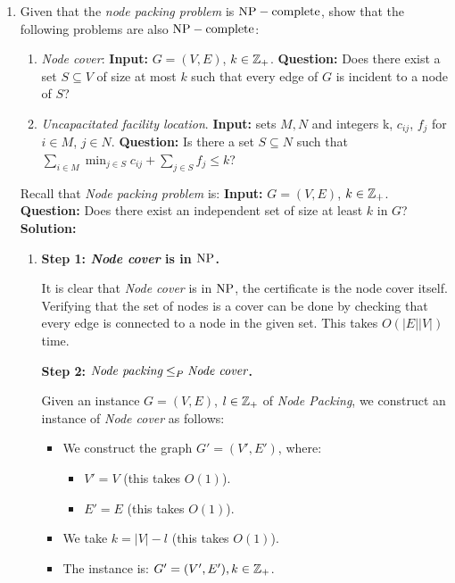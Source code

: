 \begin{enumerate}
\begin{enumerate}
{\bf Conclusion:}	the optimization version of the TSP problem is $\NP$-hard.
	
\end{enumerate}


\item Given that the {\em node packing problem} is $\NP-\text{complete}$, show that the following problems are also $\NP-\text{complete}$:
\begin{enumerate}
	\item {\em Node cover}: {\bf Input:} $G=(V,E)$, $k\in \Z_+$. {\bf Question:}  Does there exist a set $S\subseteq V$ of size at most $k$ such that every edge of $G$ is incident to a node of $S$?
	\item {\em Uncapacitated facility location}. {\bf Input:} sets $M,N$ and integers k, $c_{ij}$, $f_j$ for $i\in M$, $j\in N$. {\bf Question:} Is there a set $S\subseteq N$ such that $\sum_{i\in M}\min_{j\in S} c_{ij} + \sum_{j\in S}f_j \leq k$? 
\end{enumerate}

Recall that {\em Node packing problem} is: {\bf Input:} $G=(V,E)$, $k\in \Z_+$. {\bf Question:} Does there exist an independent set of size at least $k$ in $G$?\\

{\bf \Large Solution:}\\

\begin{enumerate}
	\item {\bf Step 1: {\em Node cover}  is in $\NP$.} 
	
	It is clear that {\em Node cover} is in $\NP$, the certificate is the node cover itself. Verifying that the set of nodes is a cover can be done by checking that every edge is connected to a node in the given set. This takes $O(|E||V|)$ time. 
	
 {\bf Step 2: $\text{{\em Node packing}}\leq_P\text{{\em Node cover}}$.} 
	
	Given an instance $G=(V,E)$, $l\in\Z_+$ of {\em Node Packing}, we construct an instance of {\em Node cover} as follows:
	\begin{itemize}
		\item We construct the graph $G'=(V',E')$, where:
		\begin{itemize}
			\item $V'=V$ (this takes $O(1)$). 
			\item $E'=E$ (this takes $O(1)$).
		\end{itemize}
		\item We take $k=|V|-l$ (this takes $O(1)$).
		\item The instance is: $G'=(V',E'), k\in\Z_+$. 
	\end{itemize}
	

\end{enumerate}
\end{enumerate}
